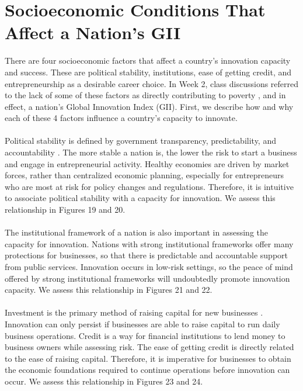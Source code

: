 \documentclass[15pt]{article}
\begin{document}
\newpage

\section{Socioeconomic Conditions That Affect a Nation's GII}

There are four socioeconomic factors that affect a country's innovation capacity and success. These are political stability, institutions, ease of getting credit, and entrepreneurship as a desirable career choice. In Week 2, class discussions referred to the lack of some of these factors as directly contributing to poverty \cite{16}, and in effect, a nation's Global Innovation Index (GII). First, we describe how and why each of these 4 factors influence a country's capacity to innovate.\\
\\
Political stability is defined by government transparency, predictability, and accountability \cite{17}. The more stable a nation is, the lower the risk to start a business and engage in entrepreneurial activity. Healthy economies are driven by market forces, rather than centralized economic planning, especially for entrepreneurs who are most at risk for policy changes and regulations. Therefore, it is intuitive to associate political stability with a capacity for innovation. We assess this relationship in Figures 19 and 20.\\
\\
The institutional framework of a nation is also important in assessing the capacity for innovation. Nations with strong institutional frameworks offer many protections for businesses, so that there is predictable and accountable support from public services. Innovation occurs in low-risk settings, so the peace of mind offered by strong institutional frameworks will undoubtedly promote innovation capacity. We assess this relationship in Figures 21 and 22.\\
\\
Investment is the primary method of raising capital for new businesses \cite{18}. Innovation can only persist if businesses are able to raise capital to run daily business operations. Credit is a way for financial institutions to lend money to business owners while assessing risk. The ease of getting credit is directly related to the ease of raising capital. Therefore, it is imperative for businesses to obtain the economic foundations required to continue operations before innovation can occur. We assess this relationship in Figures 23 and 24.\\
\end{document}
